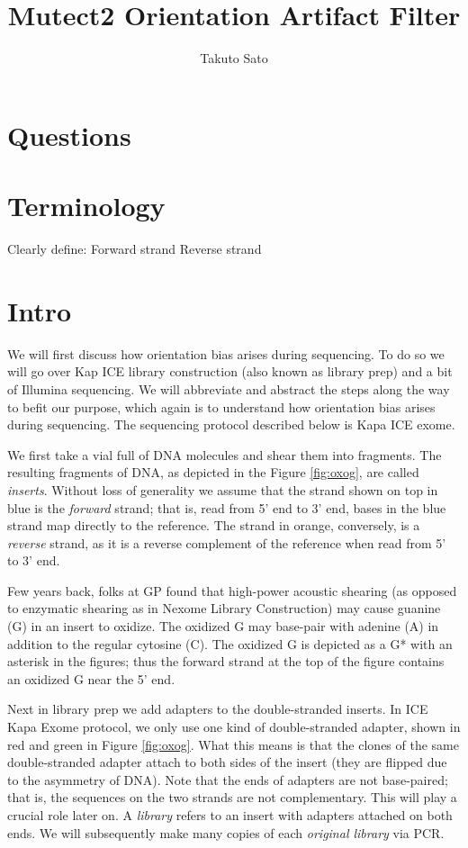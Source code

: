 \documentclass[a4paper]{article}
\title{Mutect2 Orientation Artifact Filter}
\author{Takuto Sato}
\begin{document}
\maketitle

\section{Questions}

\section{Terminology}
Clearly define:
Forward strand
Reverse strand

\section{Intro}
We will first discuss how orientation bias arises during sequencing. To do so we will go over Kap ICE library construction (also known as library prep) and a bit of Illumina sequencing. We will abbreviate and abstract the steps along the way to befit our purpose, which again is to understand how orientation bias arises during sequencing. The sequencing protocol described below is Kapa ICE exome. 

We first take a vial full of DNA molecules and shear them into fragments. The resulting fragments of DNA, as depicted in the Figure \ref{fig:oxog}, are called \textit{inserts}. Without loss of generality we assume that the strand shown on top in blue is the \textit{forward} strand; that is, read from 5' end to 3' end, bases in the blue strand map directly to the reference. The strand in orange, conversely, is a \textit{reverse} strand, as it is a reverse complement of the reference when read from 5' to 3' end.

Few years back, folks at GP found that high-power acoustic shearing (as opposed to enzymatic shearing as in Nexome Library Construction) may cause guanine (G) in an insert to oxidize. The oxidized G may base-pair with adenine (A) in addition to the regular cytosine (C). The oxidized G is depicted as a G* with an asterisk in the figures; thus the forward strand at the top of the figure contains an oxidized G near the 5' end.

Next in library prep we add adapters to the double-stranded inserts. In ICE Kapa Exome protocol, we only use one kind of double-stranded adapter, shown in red and green in Figure \ref{fig:oxog}. What this means is that the clones of the same double-stranded adapter attach to both sides of the insert (they are flipped due to the asymmetry of DNA). Note that the ends of adapters are not base-paired; that is, the sequences on the two strands are not complementary. This will play a crucial role later on.  A \textit{library} refers to an insert with adapters attached on both ends. We will subsequently make many copies of each \textit{original library} via PCR.
\end{document}
